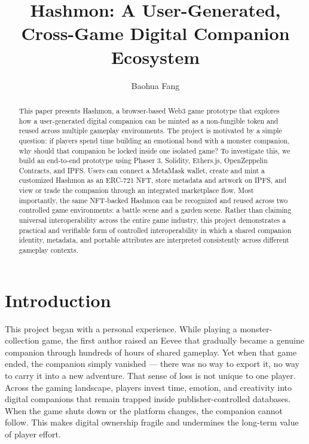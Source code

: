 \documentclass[sigconf]{acmart}
\title{Hashmon: A User-Generated, Cross-Game Digital Companion Ecosystem}
\author{Baohua Fang}
\affiliation{%
  \institution{School of Science and Engineering}
  \institution{The Chinese University of Hong Kong, Shenzhen}
  \city{Shenzhen}
  \state{Guangdong}
  \country{China}}
\begin{document}
\begin{abstract}
This paper presents Hashmon, a browser-based Web3 game prototype that explores how a user-generated digital companion can be minted as a non-fungible token and reused across multiple gameplay environments. The project is motivated by a simple question: if players spend time building an emotional bond with a monster companion, why should that companion be locked inside one isolated game? To investigate this, we build an end-to-end prototype using Phaser 3, Solidity, Ethers.js, OpenZeppelin Contracts, and IPFS. Users can connect a MetaMask wallet, create and mint a customized Hashmon as an ERC-721 NFT, store metadata and artwork on IPFS, and view or trade the companion through an integrated marketplace flow. Most importantly, the same NFT-backed Hashmon can be recognized and reused across two controlled game environments: a battle scene and a garden scene. Rather than claiming universal interoperability across the entire game industry, this project demonstrates a practical and verifiable form of controlled interoperability in which a shared companion identity, metadata, and portable attributes are interpreted consistently across different gameplay contexts.
\end{abstract}


\maketitle

\section{Introduction}
This project began with a personal experience. While playing a monster-collection game, the first author raised an Eevee that gradually became a genuine companion through hundreds of hours of shared gameplay. Yet when that game ended, the companion simply vanished --- there was no way to export it, no way to carry it into a new adventure. That sense of loss is not unique to one player. Across the gaming landscape, players invest time, emotion, and creativity into digital companions that remain trapped inside publisher-controlled databases. When the game shuts down or the platform changes, the companion cannot follow. This makes digital ownership fragile and undermines the long-term value of player effort.
\end{document}
